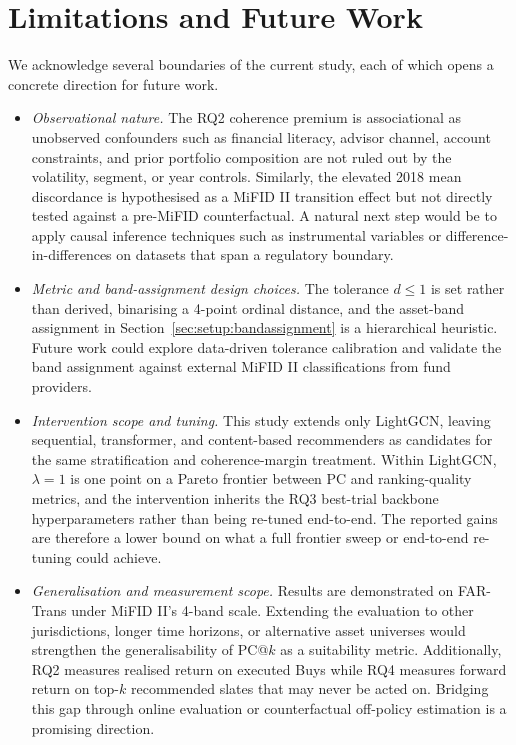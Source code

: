 \section{Limitations and Future Work}
\label{sec:limitations}

We acknowledge several boundaries of the current study, each of which opens a concrete direction for future work.

\begin{itemize}
    \item \textit{Observational nature.} The RQ2 coherence premium is associational as unobserved confounders such as financial literacy, advisor channel, account constraints, and prior portfolio composition are not ruled out by the volatility, segment, or year controls. Similarly, the elevated 2018 mean discordance is hypothesised as a MiFID II transition effect but not directly tested against a pre-MiFID counterfactual. A natural next step would be to apply causal inference techniques such as instrumental variables or difference-in-differences on datasets that span a regulatory boundary.
    \item \textit{Metric and band-assignment design choices.} The tolerance $d \leq 1$ is set rather than derived, binarising a 4-point ordinal distance, and the asset-band assignment in Section~\ref{sec:setup:bandassignment} is a hierarchical heuristic. Future work could explore data-driven tolerance calibration and validate the band assignment against external MiFID II classifications from fund providers.
    \item \textit{Intervention scope and tuning.} This study extends only LightGCN, leaving sequential, transformer, and content-based recommenders as candidates for the same stratification and coherence-margin treatment. Within LightGCN, $\lambda = 1$ is one point on a Pareto frontier between PC and ranking-quality metrics, and the intervention inherits the RQ3 best-trial backbone hyperparameters rather than being re-tuned end-to-end. The reported gains are therefore a lower bound on what a full frontier sweep or end-to-end re-tuning could achieve.
    \item \textit{Generalisation and measurement scope.} Results are demonstrated on FAR-Trans under MiFID II's 4-band scale. Extending the evaluation to other jurisdictions, longer time horizons, or alternative asset universes would strengthen the generalisability of PC@$k$ as a suitability metric. Additionally, RQ2 measures realised return on executed Buys while RQ4 measures forward return on top-$k$ recommended slates that may never be acted on. Bridging this gap through online evaluation or counterfactual off-policy estimation is a promising direction.
\end{itemize}

